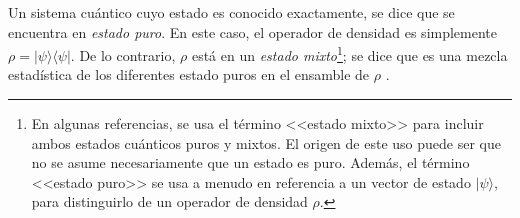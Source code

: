 Un sistema cuántico cuyo estado es conocido exactamente, se dice que
se encuentra en \textit{estado puro}. En este caso, el operador de densidad es
simplemente $\rho=|\psi \rangle \langle \psi|$. De lo contrario, $\rho$ está en
un \textit{estado mixto}\footnote{En algunas referencias, se  usa el término
<<estado mixto>> para incluir ambos estados cuánticos puros y mixtos. El origen
de este uso puede ser que no se asume necesariamente que un estado es puro. Además, el término <<estado puro>> se usa a menudo en referencia a un vector de
estado $|\psi\rangle $, para distinguirlo de un operador de densidad	$\rho$.
}; se dice que es una mezcla estadística de los diferentes estado puros en el ensamble de
$\rho$ {\cite{nielsen_chuang_2010}}. 
\begin{comment}
Estos conceptos dan pie a incluir las siguientes definiciones {\cite{wilde2011classical}}: 
\begin{definition}[\textbf{Estado máximamente mezclado}] El estado máximamente mezclado
$\sigma$ es el operador de densidad correspondiente a un conjunto uniforme de
estados ortogonales $\{\frac{1}{d},|x\ra\}$, donde $d$ es la dimensión del
espacio de Hilbert. El estado de máxima mezcla $\sigma$ es entonces igual a
\begin{equation}\label{maximallyMixedState}
		\sigma \equiv \dfrac{1}{d}\sum_x|x\rala x|=\dfrac{\mathds{1}}{d}.
	\end{equation}
\end{definition}


\begin{definition}[\textbf{Pureza}] La pureza $P(\rho)$ de un operador de densidad $\rho$ se define como sigue {\cite{wilde2011classical}} \begin{equation}
	P(\rho)\equiv\tr(\rho^\dagger\rho)=\tr(\rho^2).
\end{equation}

	\end{definition}


\begin{proposition}
	La pureza de un operador de densidad es igual a uno, si y solo si es un estado puro, y la pureza de un operador de densidad es estrictamente menor que uno, si y solo si es un estado mixto.
	\end{proposition}


\begin{proof}
	Sea un operador de densidad dado por a siguiente ecuación, \[\rho=\sum_i p_i |\psi_i\rangle \langle \psi_i|\] con $p_i\ge 0$ y $\sum_{i}p_i=1$, se tiene que:
	

\end{comment}
